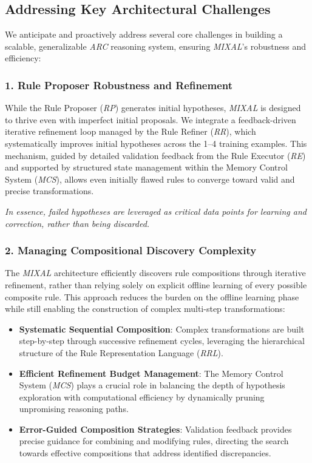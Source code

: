 \documentclass[12pt]{article}
\newcommand{\arc}{\textit{ARC}}
\newcommand{\MIXAL}{\textit{MIXAL}}
\newcommand{\rp}{\textit{RP}}
\newcommand{\mcs}{\textit{MCS}}
\newcommand{\re}{\textit{RE}}
\newcommand{\rr}{\textit{RR}}
\newcommand{\rrl}{\textit{RRL}}
\begin{document}
\subsection{Addressing Key Architectural Challenges}

We anticipate and proactively address several core challenges in building a scalable, generalizable \arc{} reasoning system, ensuring \MIXAL{}'s robustness and efficiency:

\subsubsection{1. Rule Proposer Robustness and Refinement}
While the Rule Proposer (\rp{}) generates initial hypotheses, \MIXAL{} is designed to thrive even with imperfect initial proposals. We integrate a feedback-driven iterative refinement loop managed by the Rule Refiner (\rr{}), which systematically improves initial hypotheses across the 1--4 training examples. This mechanism, guided by detailed validation feedback from the Rule Executor (\re{}) and supported by structured state management within the Memory Control System (\mcs{}), allows even initially flawed rules to converge toward valid and precise transformations.

\emph{In essence, failed hypotheses are leveraged as critical data points for learning and correction, rather than being discarded.}

\subsubsection{2. Managing Compositional Discovery Complexity}
The \MIXAL{} architecture efficiently discovers rule compositions through iterative refinement, rather than relying solely on explicit offline learning of every possible composite rule. This approach reduces the burden on the offline learning phase while still enabling the construction of complex multi-step transformations:
\begin{itemize}[noitemsep,topsep=0pt]
\item\textbf{Systematic Sequential Composition}: Complex transformations are built step-by-step through successive refinement cycles, leveraging the hierarchical structure of the Rule Representation Language (\rrl{}).
\item\textbf{Efficient Refinement Budget Management}: The Memory Control System (\mcs{}) plays a crucial role in balancing the depth of hypothesis exploration with computational efficiency by dynamically pruning unpromising reasoning paths.
\item\textbf{Error-Guided Composition Strategies}: Validation feedback provides precise guidance for combining and modifying rules, directing the search towards effective compositions that address identified discrepancies.
\end{itemize}
\end{document}
